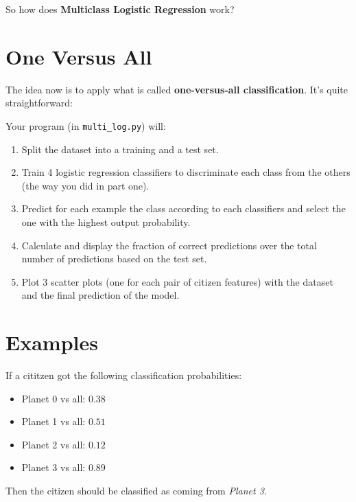 So how does \textbf{Multiclass Logistic Regression} work?  

\section*{One Versus All}
The idea now is to apply what is called \textbf{one-versus-all classification}.
It's quite straightforward:

Your program (in \texttt{multi\_log.py}) will:
\begin{enumerate}
  \item Split the dataset into a training and a test set.
  \item Train 4 logistic regression classifiers to discriminate each class from the others (the way you did in part one).
  \item Predict for each example the class according to each classifiers and select the one with the highest output probability.
  \item Calculate and display the fraction of correct predictions over the total number of predictions based on the test set.
  \item Plot 3 scatter plots (one for each pair of citizen features) with the dataset and the final prediction of the model.
\end{enumerate}


\section*{Examples}
If a cititzen got the following classification probabilities: 
\begin{itemize}
  \item Planet 0 vs all: $0.38$
  \item Planet 1 vs all: $0.51$
  \item Planet 2 vs all: $0.12$
  \item Planet 3 vs all: $0.89$
\end{itemize}

Then the citizen should be classified as coming from \textit{Planet 3}. 